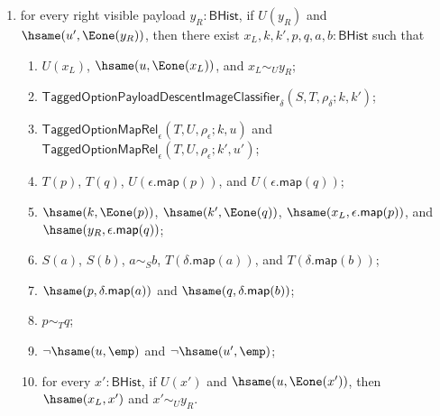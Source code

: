 \begin{theorem}
\begin{enumerate}
\begin{enumerate}
$\hsame(x_L,\epsilon.\mathsf{map}(p))$, and
$\hsame(y_R,\epsilon.\mathsf{map}(q))$;
\item $S(a)$, $S(b)$, $a\sim_S b$, $T(\delta.\mathsf{map}(a))$, and
$T(\delta.\mathsf{map}(b))$;
\item $\hsame(p,\delta.\mathsf{map}(a))$ and
$\hsame(q,\delta.\mathsf{map}(b))$;
\item $p\sim_T q$;
\item $\neg\hsame(u,\emp)$ and $\neg\hsame(u',\emp)$;
\item for every $y':\mathsf{BHist}$, if $U(y')$ and
$\hsame(u',\Eone(y'))$, then $\hsame(y_R,y')$ and $x_L\sim_U y'$.
\end{enumerate}
\item for every right visible payload $y_R:\mathsf{BHist}$, if $U(y_R)$ and
$\hsame(u',\Eone(y_R))$, then there exist $x_L,k,k',p,q,a,b:\mathsf{BHist}$ such
that
\begin{enumerate}
\item $U(x_L)$, $\hsame(u,\Eone(x_L))$, and $x_L\sim_U y_R$;
\item $\mathsf{TaggedOptionPayloadDescentImageClassifier}_{\delta}
(S,T,\rho_{\delta};k,k')$;
\item $\mathsf{TaggedOptionMapRel}_{\epsilon}(T,U,\rho_{\epsilon};k,u)$ and
$\mathsf{TaggedOptionMapRel}_{\epsilon}(T,U,\rho_{\epsilon};k',u')$;
\item $T(p)$, $T(q)$, $U(\epsilon.\mathsf{map}(p))$, and
$U(\epsilon.\mathsf{map}(q))$;
\item $\hsame(k,\Eone(p))$, $\hsame(k',\Eone(q))$,
$\hsame(x_L,\epsilon.\mathsf{map}(p))$, and
$\hsame(y_R,\epsilon.\mathsf{map}(q))$;
\item $S(a)$, $S(b)$, $a\sim_S b$, $T(\delta.\mathsf{map}(a))$, and
$T(\delta.\mathsf{map}(b))$;
\item $\hsame(p,\delta.\mathsf{map}(a))$ and
$\hsame(q,\delta.\mathsf{map}(b))$;
\item $p\sim_T q$;
\item $\neg\hsame(u,\emp)$ and $\neg\hsame(u',\emp)$;
\item for every $x':\mathsf{BHist}$, if $U(x')$ and
$\hsame(u,\Eone(x'))$, then $\hsame(x_L,x')$ and $x'\sim_U y_R$.
\end{enumerate}
\end{enumerate}
\end{theorem}
